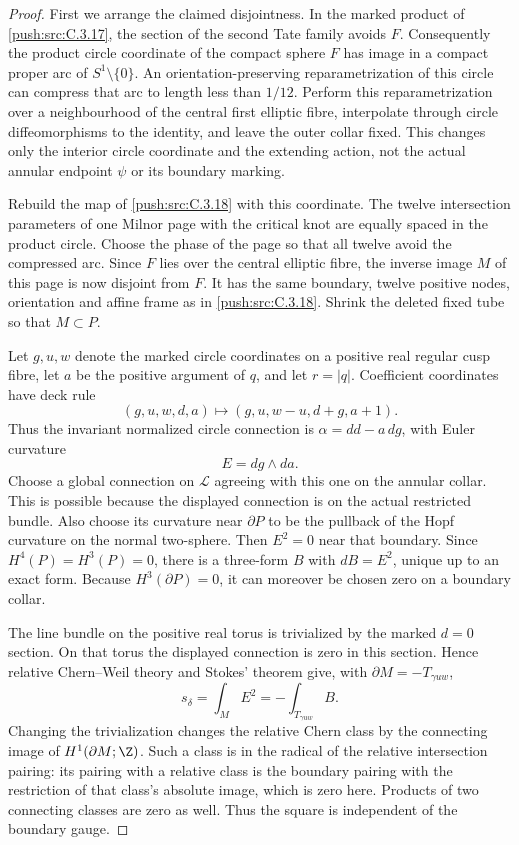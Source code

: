 \begin{proof}
First we arrange the claimed disjointness. In the marked product
of \ref{push:src:C.3.17}, the section of the second Tate family avoids $F$.
Consequently the product circle coordinate of the compact sphere
$F$ has image in a compact proper arc of $S^1\setminus\{0\}$.
An orientation-preserving reparametrization of this circle can
compress that arc to length less than $1/12$. Perform this
reparametrization over a neighbourhood of the central first
elliptic fibre, interpolate through circle diffeomorphisms to the
identity, and leave the outer collar fixed. This changes only the
interior circle coordinate and the extending action, not the
actual annular endpoint $\psi$ or its boundary marking.

Rebuild the map of \ref{push:src:C.3.18} with this coordinate. The twelve
intersection parameters of one Milnor page with the critical
knot are equally spaced in the product circle. Choose the phase
of the page so that all twelve avoid the compressed arc.
Since $F$ lies over the central elliptic fibre, the inverse image
$M$ of this page is now disjoint from $F$. It has the same
boundary, twelve positive nodes, orientation and affine frame
as in \ref{push:src:C.3.18}. Shrink the deleted fixed tube so that $M\subset P$.

Let $g,u,w$ denote the marked circle coordinates on a positive
real regular cusp fibre, let $a$ be the positive argument of
$q$, and let $r=|q|$. Coefficient coordinates have deck rule
\[
 (g,u,w,d,a)\longmapsto(g,u,w-u,d+g,a+1).
\]
Thus the invariant normalized circle connection is
$\alpha=dd-a\,dg$, with Euler curvature
\[
 E=dg\wedge da.
\]
Choose a global connection on $\mathcal L$ agreeing with this
one on the annular collar. This is possible because the displayed
connection is on the actual restricted bundle. Also choose its
curvature near $\partial P$ to be the pullback of the Hopf
curvature on the normal two-sphere. Then $E^2=0$ near that
boundary. Since $H^4(P)=H^3(P)=0$, there is a three-form $B$
with $dB=E^2$, unique up to an exact form. Because
$H^3(\partial P)=0$, it can moreover be chosen zero on a
boundary collar.

The line bundle on the positive real torus is trivialized by
the marked $d=0$ section. On that torus the displayed connection
is zero in this section. Hence relative Chern--Weil theory and
Stokes' theorem give, with $\partial M=-T_{\gamma uw}$,
\[
 s_\delta=\int_M E^2
          =-\int_{T_{\gamma uw}}B.
\]
Changing the trivialization changes the relative Chern class by
the connecting image of $H^1(\partial M;\Z)$. Such a class is
in the radical of the relative intersection pairing: its
pairing with a relative class is the boundary pairing with the
restriction of that class's absolute image, which is zero here.
Products of two connecting classes are zero as well. Thus the
square is independent of the boundary gauge.


\end{proof}
